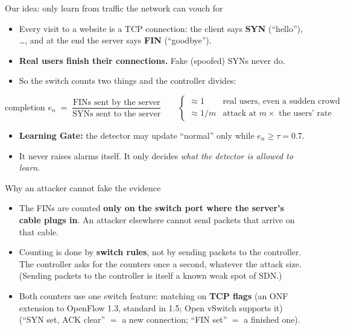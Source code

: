 \documentclass[aspectratio=169,11pt]{beamer}
\newcommand{\key}[1]{\textcolor{gate}{\textbf{#1}}}
\newcommand{\aside}[1]{{\small\color{muted}#1}}
\begin{document}
\begin{frame}{Our idea: only learn from traffic the network can vouch for}
\begin{itemize}\setlength\itemsep{2.5mm}
\item Every visit to a website is a TCP connection: the client says \textbf{SYN} (``hello''),
      \dots, and at the end the server says \textbf{FIN} (``goodbye'').
\item \textbf{Real users finish their connections.} Fake (spoofed) SYNs never do.
\item So the switch counts two things and the controller divides:
\end{itemize}
\vspace{1mm}
\[
  \text{completion } e_n \;=\; \frac{\text{FINs sent by the server}}{\text{SYNs sent to the server}}
  \qquad\begin{cases} \approx 1 & \text{real users, even a sudden crowd}\\
                      \approx 1/m & \text{attack at } m\times \text{ the users' rate}\end{cases}
\]
\vspace{1mm}
\begin{itemize}
\item \key{Learning Gate:} the detector may update ``normal'' only while $e_n \ge \tau = 0.7$.
\item It never raises alarms itself. It only decides \emph{what the detector is allowed to learn}.
\end{itemize}
\end{frame}

\begin{frame}{Why an attacker cannot fake the evidence}
\begin{itemize}\setlength\itemsep{3mm}
\item The FINs are counted \textbf{only on the switch port where the server's cable plugs in}.
      An attacker elsewhere cannot send packets that arrive on that cable.
\item Counting is done by \textbf{switch rules}, not by sending packets to the controller.
      The controller asks for the counters once a second, whatever the attack size.
      \aside{(Sending packets to the controller is itself a known weak spot of SDN.)}
\item Both counters use one switch feature: matching on \textbf{TCP flags}
      \aside{(an ONF extension to OpenFlow 1.3, standard in 1.5; Open vSwitch supports it)}
      (``SYN set, ACK clear'' $=$ a new connection; ``FIN set'' $=$ a finished one).
\end{itemize}
\end{frame}
\end{document}
